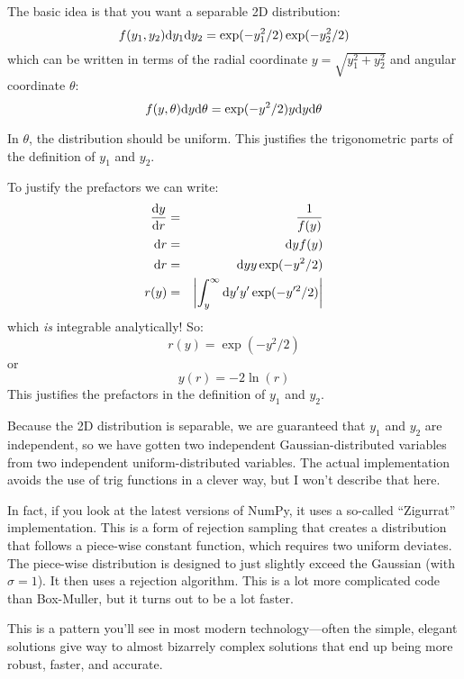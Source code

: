 The basic idea is that you want a separable 2D distribution:
\begin{equation}
f(y_1, y_2) {\rm d}y_1 {\rm d}y_2 = \exp( - y_1^2/2) \exp(- y_2^2/2)
\end{equation}
which can be written in terms of the radial coordinate $y =
\sqrt{y_1^2 + y_2^2}$ and angular coordinate $\theta$:
\begin{equation}
f(y, \theta) {\rm d}y {\rm d}\theta = 
\exp(-y^2/2) y {\rm d}y {\rm d}\theta
\end{equation}

In $\theta$, the distribution should be uniform. This justifies the
trigonometric parts of the definition of $y_1$ and $y_2$.

To justify the prefactors we can write:
\begin{eqnarray}
\frac{{\rm d}y}{{\rm d}r} &=& \frac{1}{f(y)} \cr
{{\rm d}r} &=& {\rm d}y {f(y)} \cr
{{\rm d}r} &=& {\rm d}y y \exp(-y^2/2) \cr
r(y) &=& \left|\int_y^{\infty} {\rm d}y' y' \exp(-y'^2/2)\right|
\end{eqnarray}
which {\it is} integrable analytically! So:
\begin{equation}
r(y) = \exp(- y^2 /2)
\end{equation}
or 
\begin{equation}
y(r) = -2 \ln(r)
\end{equation}
This justifies the prefactors in the definition of $y_1$ and $y_2$. 

Because the 2D distribution is separable, we are guaranteed that $y_1$
and $y_2$ are independent, so we have gotten two independent
Gaussian-distributed variables from two independent
uniform-distributed variables. The actual implementation avoids the
use of trig functions in a clever way, but I won't describe that here.

In fact, if you look at the latest versions of NumPy, it uses a
so-called ``Zigurrat'' implementation. This is a form of rejection
sampling that creates a distribution that follows a piece-wise
constant function, which requires two uniform deviates. The piece-wise
distribution is designed to just slightly exceed the Gaussian (with
$\sigma=1$). It then uses a rejection algorithm. This is a lot more
complicated code than Box-Muller, but it turns out to be a lot
faster.

This is a pattern you'll see in most modern technology---often the
simple, elegant solutions give way to almost bizarrely complex
solutions that end up being more robust, faster, and accurate.

